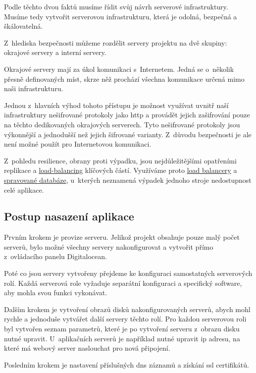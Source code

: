 \emptyLine

Podle těchto dvou faktů musíme řídit svůj návrh serverové infrastruktury.  Musíme tedy vytvořit serverovou infrastrukturu, která je odolná, bezpečná a škálovatelná.

Z~hlediska bezpečnosti můžeme rozdělit servery projektu \bso{} na dvě skupiny: okrajové servery a interní servery.

Okrajové servery mají za úkol komunikaci s~Internetem. Jedná se o~několik přesně definovaných míst, skrze něž prochází všechna komunikace určená mimo naši infrastrukturu.

Jednou z~hlavních výhod tohoto přístupu je možnost využívat uvnitř naší infrastruktury nešifrované protokoly jako \acrshort{http} a provádět jejich zašifrování pouze na těchto dedikovaných okrajových serverech. Tyto nešifrované protokoly jsou výkonnější a jednodušší než jejich šifrované varianty\cite{http-faster-https}. Z~důvodu bezpečnosti je ale není možné použít pro Internetovou komunikaci.

Z~pohledu resilience, obrany proti výpadku, jsou nejdůležitějšími opatřeními replikace a \hyperref[sub:load-balancing]{load-balancing} klíčových částí. Využíváme proto \hyperref[sub:load-balancing]{load balancery} a \hyperref[subsub:managed-databases]{spravované databáze}, u~kterých neznamená výpadek jednoho stroje nedostupnost celé aplikace.


\subsection{Postup nasazení aplikace}
\label{sub:deployment}

Prvním krokem je provize serveru. Jelikož projekt \bso{} obsahuje pouze malý počet serverů, bylo možné všechny servery nakonfigurovat a vytvořit přímo z~ovládacího panelu Digitalocean.

Poté co jsou servery vytvořeny přejdeme ke konfiguraci samostatných serverových rolí. Každá serverová role vyžaduje separátní konfiguraci a specifický software, aby mohla svou funkci vykonávat.

Dalším krokem je vytvoření obrazů disků nakonfigurovaných serverů, abych mohl rychle a jednoduše vytvářet další servery těchto rolí. Pro každou serverovou roli byl vytvořen seznam parametrů, které je po vytvoření serveru z~obrazu disku nutné upravit. U~aplikačních serverů je například nutné upravit \acrshort{ip} adresu, na které má webový server naslouchat pro nová připojení. 

Posledním krokem je nastavení příslušných \acrshort{dns} záznamů a získání \acrshort{ssl} certifikátů.

